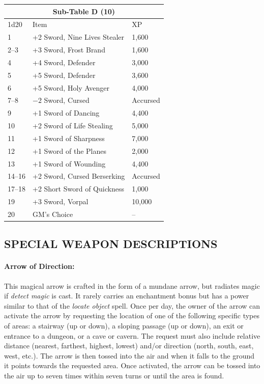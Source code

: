\begin{multicols}{2}
\noindent \begin{tabular}{|p{}|p{}|p{}|}
\multicolumn{3}{c}{Sub-Table D (10)} \\
\hline
1d20	& Item	& XP \\
\hline\hline
\rowcolor[gray]{.9}1	& +2 Sword, Nine Lives Stealer	& 1,600 \\
2--3	& +3 Sword, Frost Brand	& 1,600 \\
\rowcolor[gray]{.9}4	& +4 Sword, Defender	& 3,000 \\
5	& +5 Sword, Defender	& 3,600 \\
\rowcolor[gray]{.9}6	& +5 Sword, Holy Avenger	& 4,000 \\
7--8	& $-2$ Sword, Cursed	& Accursed \\
\rowcolor[gray]{.9}9	& +1 Sword of Dancing	& 4,400 \\
10	& +2 Sword of Life Stealing	& 5,000 \\
\rowcolor[gray]{.9}11	& +1 Sword of Sharpness	& 7,000 \\
12	& +1 Sword of the Planes	& 2,000 \\
\rowcolor[gray]{.9}13	& +1 Sword of Wounding	& 4,400 \\
14--16	& +2 Sword, Cursed Berserking	& Accursed \\
\rowcolor[gray]{.9}17--18	& +2 Short Sword of Quickness	& 1,000 \\
19	& +3 Sword, Vorpal	& 10,000 \\
\rowcolor[gray]{.9}20	& GM's Choice	& -- \\
\hline
\end{tabular}

\subsection{SPECIAL WEAPON DESCRIPTIONS}

\paragraph{Arrow of Direction:} This magical arrow is crafted in the form of a mundane arrow, but radiates magic if \textit{detect magic} is cast.  It rarely carries an enchantment bonus but has a power similar to that of the \textit{locate object} spell.  Once per day, the owner of the arrow can activate the arrow by requesting the location of one of the following specific types of areas: a stairway (up or down), a sloping passage (up or down), an exit or entrance to a dungeon, or a cave or cavern.  The request must also include relative distance (nearest, farthest, highest, lowest) and/or direction (north, south, east, west, etc.).  The arrow is then tossed into the air and when it falls to the ground it points towards the requested area.  Once activated, the arrow can be tossed into the air up to seven times within seven turns or until the area is found.


\end{multicols}
